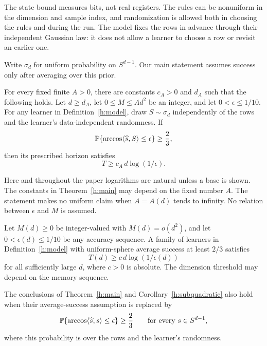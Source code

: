 The state bound measures bits, not real registers. The rules can be
nonuniform in the dimension and sample index, and randomization is
allowed both in choosing the rules and during the run. The model fixes
the rows in advance through their independent Gaussian law: it does
not allow a learner to choose a row or revisit an earlier one.

Write \(\sigma_d\) for uniform probability on \(S^{d-1}\). Our main
statement assumes success only after averaging over this prior.

\begin{theorem}\label{h:main}
For every fixed finite \(A>0\), there are constants \(c_A>0\) and
\(d_A\) such that the following holds. Let \(d\ge d_A\), let
\(0\le M\le Ad^2\) be an integer, and let \(0<\epsilon\le1/10\).
For any learner in Definition~\ref{h:model}, draw
\(S\sim\sigma_d\) independently of the rows and the learner's
data-independent randomness. If
\[
 \mathbb P\{\arccos\langle \widehat s,S\rangle\le\epsilon\}\ge\frac23,
\]
then its prescribed horizon satisfies
\[
 T\ge c_A\,d\log(1/\epsilon).
\]
\end{theorem}

Here and throughout the paper logarithms are natural unless a base is
shown. The constants in Theorem~\ref{h:main} may depend on the fixed
number \(A\). The statement makes no uniform claim when \(A=A(d)\)
tends to infinity. No relation between \(\epsilon\) and \(M\) is
assumed.

\begin{corollary}\label{h:subquadratic}
Let \(M(d)\ge0\) be integer-valued with \(M(d)=o(d^2)\), and let
\(0<\epsilon(d)\le1/10\) be any accuracy sequence. A family of learners
in Definition~\ref{h:model} with uniform-sphere average success at
least \(2/3\) satisfies
\[
 T(d)\ge c\,d\log(1/\epsilon(d))
\]
for all sufficiently large \(d\), where \(c>0\) is absolute. The
dimension threshold may depend on the memory sequence.
\end{corollary}

\begin{corollary}\label{h:worst-signal}
The conclusions of Theorem~\ref{h:main} and
Corollary~\ref{h:subquadratic} also hold when their average-success
assumption is replaced by
\[
 \mathbb P\{\arccos\langle \widehat s,s\rangle\le\epsilon\}\ge\frac23
 \qquad\text{for every }s\in S^{d-1},
\]
where this probability is over the rows and the learner's randomness.
\end{corollary}

